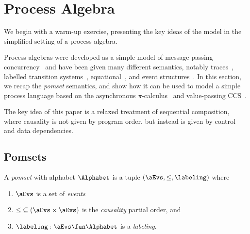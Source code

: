 \section{Process Algebra}

We begin with a warm-up exercise, presenting the key ideas of the
model in the simplified setting of a process algebra.

Process algebras were developed as a simple model of message-passing
concurrency~\cite{DBLP:books/daglib/0067019,DBLP:books/ph/Hoare85,DBLP:books/daglib/0069083}
and have been given many different semantics, notably traces~\cite{???},
labelled transition systems~\cite{???}, equational~\cite{???}, and event
structures~\cite{???}.  In this section, we recap the \emph{pomset}
semantics, and show how it can be used to model a simple process language
based on the asynchronous $\pi$-calculus~\cite{???} and value-passing
CCS~\cite{???}.

The key idea of this paper is a relaxed treatment of sequential
composition, where causality is not given by program order, but
instead is given by control and data dependencies.


\subsection{Pomsets}

\begin{definition}
  A \emph{pomset} with alphabet $\Alphabet$ is a tuple
  $(\aEvs, {\le}, \labeling)$ where
  \begin{enumerate}
  \item $\aEvs$ is a set of \emph{events}
  \item
    ${\le} \subseteq (\aEvs\times\aEvs)$ is the \emph{causality} partial order, and
  \item
    $\labeling: \aEvs \fun \Alphabet$ is a \emph{labeling}.
  \end{enumerate}
\end{definition}


